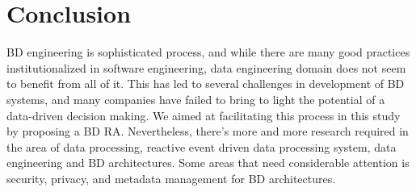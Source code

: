 \documentclass[conference]{IEEEtran}
\begin{document}
\section{Conclusion}
  
 BD engineering is sophisticated process, and while there are many good practices institutionalized in software engineering, data engineering domain does not seem to benefit from all of it. This has led to several challenges in development of BD systems, and many companies have failed to bring to light the potential of a data-driven decision making. We aimed at facilitating this process in this study by proposing a BD RA. Nevertheless, there's more and more research required in the area of data processing, reactive event driven data processing system, data engineering and BD architectures. Some areas that need considerable attention is security, privacy, and metadata management for BD architectures.

%
%
%
%    
%    
%    
%    



\end{document}
